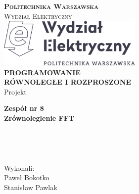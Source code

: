 

\begin{titlepage}

	
	\thispagestyle{fancy}							%
	\fancyhf{}										%
	\renewcommand{\headrulewidth}{0pt}				%
	
	\linespread{1.0}								%

	\center
	
	
	\textsc{\LARGE \textbf{Politechnika Warszawska}}\\[0.75cm]
	\textsc{\Large Wydział Elektryczny}\\[2cm]


	\includegraphics[width=7cm]{figures/WE-znak}\\[2cm]
	
	
	{\LARGE \textbf{PROGRAMOWANIE\\
			 RÓWNOLEGŁE I ROZPROSZONE}\\[0.3cm]}
	{\Large Projekt\\[2.5cm]}
		
	
	{\huge \bfseries Zespół nr 8\\[2cm] Zrównoleglenie FFT 
		\\[4.5cm]}

	
	\large
	\begin{minipage}{0.2\textwidth}
	~
	\end{minipage}
	~
	\begin{minipage}{0.7\textwidth}
		\begin{flushright}
		Wykonali:\\
 		Paweł Bokotko \\
 		Stanisław Pawlak\\
 	
 		
		\end{flushright}
	\end{minipage}	
	
\end{titlepage}


